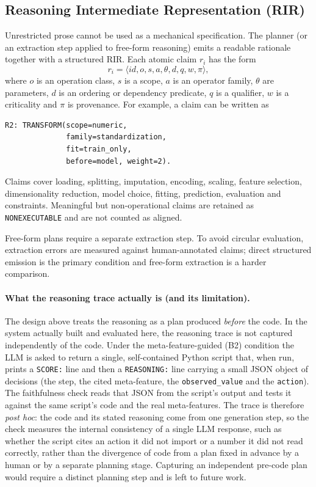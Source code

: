 \subsection{Reasoning Intermediate Representation (RIR)}

Unrestricted prose cannot be used as a mechanical specification. The
planner (or an extraction step applied to free-form reasoning)
emits a readable rationale together with a structured RIR. Each
atomic claim $r_i$ has the form
\[
r_i = \langle id, o, s, a, \theta, d, q, w, \pi \rangle ,
\]
where $o$ is an operation class, $s$ is a scope, $a$ is an operator
family, $\theta$ are parameters, $d$ is an ordering or dependency
predicate, $q$ is a qualifier, $w$ is a criticality and $\pi$ is
provenance. For example, a claim can be written as
\begin{verbatim}
R2: TRANSFORM(scope=numeric,
              family=standardization,
              fit=train_only,
              before=model, weight=2).
\end{verbatim}
Claims cover loading, splitting, imputation, encoding, scaling,
feature selection, dimensionality reduction, model choice, fitting,
prediction, evaluation and constraints. Meaningful but
non-operational claims are retained as \texttt{NONEXECUTABLE} and
are not counted as aligned.

Free-form plans require a separate extraction step. To avoid
circular evaluation, extraction errors are measured against
human-annotated claims; direct structured emission is the primary
condition and free-form extraction is a harder comparison.

\paragraph{What the reasoning trace actually is (and its limitation).}
The design above treats the reasoning as a plan produced \emph{before}
the code. In the system actually built and evaluated here, the
reasoning trace is not captured independently of the code. Under the
meta-feature-guided (B2) condition the LLM is asked to return a
single, self-contained Python script that, when run, prints a
\texttt{SCORE:} line and then a \texttt{REASONING:} line carrying a
small JSON object of decisions (the step, the cited meta-feature, the
\texttt{observed\_value} and the \texttt{action}). The faithfulness
check reads that JSON from the script's output and tests it against the
same script's code and the real meta-features. The trace is therefore
\emph{post hoc}: the code and its stated reasoning come from one
generation step, so the check measures the internal consistency of a
single LLM response, such as whether the script cites an action it did not
import or a number it did not read correctly, rather than the
divergence of code from a plan fixed in advance by a human or by a
separate planning stage. Capturing an independent pre-code plan would
require a distinct planning step and is left to future work.

